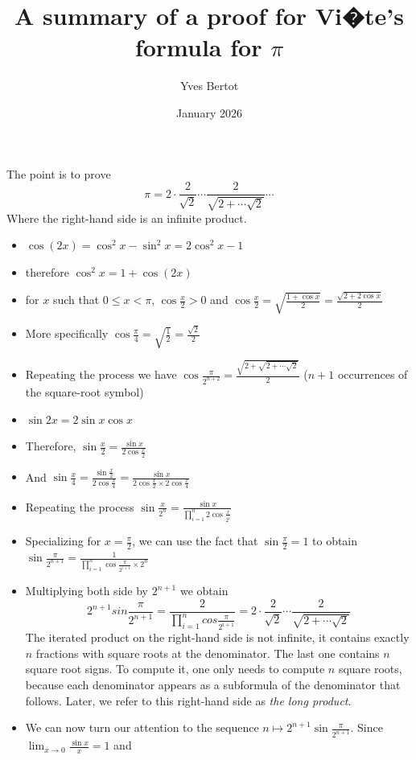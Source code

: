 \documentclass{article}
\title{A summary of a proof for Vi�te's formula for \(\pi\)}
\author{Yves Bertot}
\date{January 2026}
\begin{document}
The point is to prove
\[\pi = 2 \cdot \frac 2 {\sqrt{2}} \cdots \frac 2 {\sqrt{2 + \cdots \sqrt{2}}} \cdots\]
Where the right-hand side is an infinite product.
\begin{itemize}
\item \(\cos (2 x) = \cos^2 x - \sin^2 x = 2\cos^2 x - 1\)
\item therefore \(\cos^2 x = 1 +\cos (2 x)\)
\item for \(x\) such that \(0 \leq x < \pi\),  \(\cos \frac{x}{2} > 0\) and
\(\cos \frac{x}{2} = \sqrt{\frac{1 +\cos x}{2}} = \frac{\sqrt {2 + 2\cos x}}2\)
\item More specifically \(\cos \frac{\pi}4 = \sqrt{\frac 1 2}=
\frac{\sqrt{2}} 2 \)
\item Repeating the process we have
\(\cos \frac{\pi}{2 ^ {n + 2}} = \frac{\sqrt{2 + \sqrt {2 + \cdots \sqrt{2}}}}{2}\)
(\(n + 1\) occurrences of the square-root symbol)
\item \(\sin 2 x = 2 \sin x \cos x\)
\item Therefore, \(\sin \frac x 2 = \frac {\sin x}{2 \cos \frac x 2}\)
\item And \(\sin \frac x 4 = \frac {\sin \frac x 2}{2 \cos \frac x 4} =
\frac{\sin x}{2 \cos \frac x 2 \times 2 \cos \frac x 4}\)
\item Repeating the process \(\sin \frac x{2 ^ n} =
  \frac{\sin x} {\prod_{i=1}^{n} 2 {\cos \frac{x}{2 ^ i}}}\)
\item Specializing for \(x=\frac \pi 2\), we can use the fact that
\(\sin \frac \pi 2 = 1\) to obtain
\(\sin \frac \pi {2 ^ {n + 1}} =
  \frac 1 {\prod_{i = 1}^n {\cos \frac{\pi}{2 ^ {i + 1}}} \times 2 ^ n}\)
\item Multiplying both side by \(2 ^ {n + 1}\) we obtain
\[2 ^ {n + 1} sin \frac{\pi}{2 ^ {n+1}} =
 \frac 2 {\prod_{i = 1}^n {cos \frac \pi {2 ^ {i + 1}}}} =
2 \cdot \frac 2 {\sqrt{2}} \cdots \frac 2 {\sqrt{2 + \cdots \sqrt{2}}}\]
The iterated product on the right-hand side is not infinite, it contains 
exactly \(n\) fractions with square roots at the denominator.  The last
one contains \(n\) square root signs.  To compute it, one only needs to
compute \(n\) square roots, because each denominator appears as a
subformula of the denominator that follows.  Later, we refer to this
right-hand side as {\em the long product}.
\item We can now turn our attention to the sequence
\(n \mapsto 2 ^ {n + 1} \sin \frac \pi {2 ^ {n + 1}}\).
  Since \(\lim_{x \rightarrow 0} \frac{\sin x}{x} = 1\) and

\end{itemize}
\end{document}
